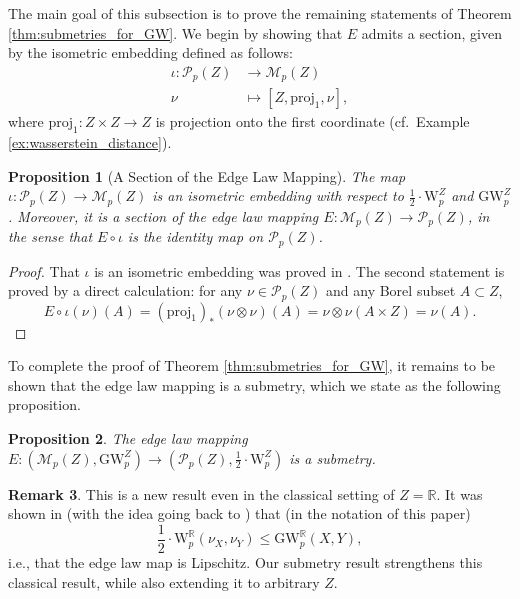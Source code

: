 \documentclass{article}
\newtheorem{proposition}{Proposition}[section]
\theoremstyle{definition}
\newtheorem{remark}[proposition]{Remark}
\newcommand{\R}{\mathbb{R}}
\newcommand{\M}{\mathcal{M}}
\newcommand{\MZp}{\M_p(Z)}
\newcommand{\dgwz}{\mathrm{GW}_p^Z}
\newcommand{\WZ}{\mathcal{P}_p(Z)}
\newcommand{\wz}{\mathrm{W}_p^Z}
\begin{document}
The main goal of this subsection is to prove the remaining statements of Theorem \ref{thm:submetries_for_GW}. We begin by showing that $E$ admits a section, given by the isometric embedding defined as follows:
\begin{align}
    \iota: \WZ &\to \MZp \\
    \nu &\mapsto [Z,\mathrm{proj}_1,\nu],
\end{align}
where $\mathrm{proj}_1:Z \times Z \to Z$ is projection onto the first coordinate (cf.~Example \ref{ex:wasserstein_distance}).

\begin{proposition}[A Section of the Edge Law Mapping]
    \label{prop:edge_law_section}
    The map $\iota:\WZ \to \MZp$ is an isometric embedding with respect to $\frac{1}{2} \cdot \wz$ and $\dgwz$. Moreover, it is a section of the edge law mapping $E:\MZp \to \WZ$, in the sense that $E \circ \iota$ is the identity map on $\WZ$.
\end{proposition}

\begin{proof}
    That $\iota$ is an isometric embedding was proved in \cite[Proposition 14]{bauer2025zgromovwassersteindistance}. The second statement is proved by a direct calculation: for any $\nu \in \WZ$ and any Borel subset $A \subset Z$, 
    \[
    E \circ \iota (\nu)(A) = (\mathrm{proj}_1)_\ast (\nu \otimes \nu) (A) = \nu \otimes \nu (A \times Z) = \nu(A).
    \]
\end{proof}



To complete the proof of Theorem \ref{thm:submetries_for_GW}, it remains to be shown that the edge law mapping is a submetry, which we state as the following proposition.


\begin{proposition}
    \label{prop:edge_law_submetry}
    The edge law mapping $E: (\MZp,\dgwz) \to (\WZ,\frac{1}{2} \cdot \wz)$ is a submetry.
\end{proposition}

\begin{remark}
    This is a new result even in the classical setting of $Z = \R$. It was shown in \cite[Theorem 3.1]{chowdhury2019gromovwassersteindistancenetworksstable} (with the idea going back to \cite[Corollary 6.2]{Memoli2011GromovWasserstein}) that (in the notation of this paper)
    \[
    \frac{1}{2}\cdot \mathrm{W}^\R_p(\nu_X,\nu_Y) \leq \mathrm{GW}^\R_p(X,Y),
    \]
    i.e., that the edge law map is Lipschitz. Our submetry result strengthens this classical result, while also extending it to arbitrary $Z$. 
\end{remark}
\end{document}
